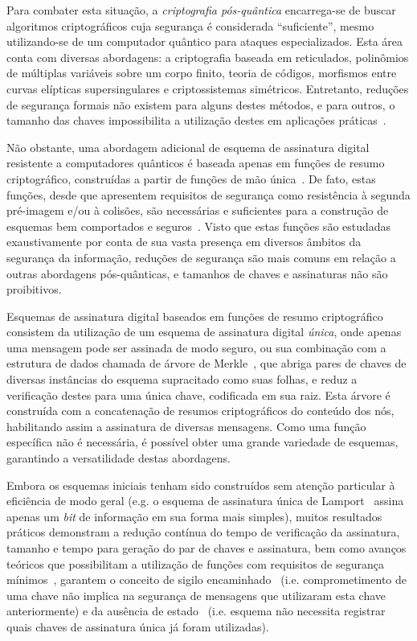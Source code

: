 \documentclass[12pt]{report}
\begin{document}
Para combater esta situação, a \emph{criptografia pós-quântica} encarrega-se de
buscar algoritmos criptográficos cuja segurança é considerada ``suficiente'',
mesmo utilizando-se de um computador quântico para ataques especializados. Esta
área conta com diversas abordagens: a criptografia baseada em reticulados,
polinômios de múltiplas variáveis sobre um corpo finito, teoria de códigos,
morfismos entre curvas elípticas supersingulares e criptossistemas simétricos.
Entretanto, reduções de segurança formais não existem para alguns destes
métodos, e para outros, o tamanho das chaves impossibilita a utilização destes
em aplicações práticas~\cite{Bernstein2017}.

Não obstante, uma abordagem adicional de esquema de assinatura digital
resistente a computadores quânticos é baseada apenas em funções de
resumo criptográfico, construídas a partir de funções de mão
única~\cite{cryptoeprint:2005:328}. De fato, estas funções, desde que
apresentem requisitos de segurança como resistência à segunda pré-imagem e/ou
à colisões, são necessárias e suficientes para a construção de esquemas bem
comportados e seguros~\cite{Rompel:1990:OFN:100216.100269}. Visto que estas
funções são estudadas exaustivamente por conta de sua vasta presença em
diversos âmbitos da segurança da informação, reduções de segurança são mais
comuns em relação a outras abordagens pós-quânticas, e tamanhos de chaves e
assinaturas não são proibitivos.

Esquemas de assinatura digital baseados em funções de resumo criptográfico
consistem da utilização de um esquema de assinatura digital \emph{única}, onde
apenas uma mensagem pode ser assinada de modo seguro, ou sua combinação com a
estrutura de dados chamada de árvore de Merkle~\cite{Merkle:1989:CDS:118209.118230},
que abriga pares de chaves de diversas instâncias
do esquema supracitado como suas folhas, e reduz a verificação destes para uma
única chave, codificada em sua raiz. Esta árvore é construída com a
concatenação de resumos criptográficos do conteúdo dos nós, habilitando assim a
assinatura de diversas mensagens. Como uma função específica não é necessária,
é possível obter uma grande variedade de esquemas, garantindo a versatilidade
destas abordagens.

Embora os esquemas iniciais tenham sido construídos sem atenção particular à
eficiência de modo geral (e.g. o esquema de assinatura única de
Lamport~\cite{lamport1979constructing} assina apenas um \emph{bit}
de informação em sua forma mais simples), muitos resultados práticos demonstram
a redução contínua do tempo de verificação da assinatura, tamanho e tempo para
geração do par de chaves e assinatura, bem como avanços teóricos que
possibilitam a utilização de funções com requisitos de segurança 
mínimos~\cite{Hlsing2013}, garantem o conceito de sigilo
encaminhado~\cite{Buchmann:2011:XPF:2184003.2184011} (i.e. comprometimento de
uma chave não implica na segurança de mensagens que utilizaram esta chave
anteriormente) e da ausência de estado~\cite{Bernstein2015} (i.e. esquema não
necessita registrar quais chaves de assinatura única já foram utilizadas).
\end{document}

